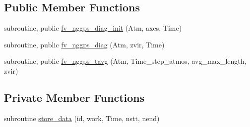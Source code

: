 \subsection*{Public Member Functions}
\begin{DoxyCompactItemize}
\item 
subroutine, public \hyperlink{classfv__nggps__diags__mod_ab37da1eb0394d52c06db856e9f875833}{fv\-\_\-nggps\-\_\-diag\-\_\-init} (Atm, axes, Time)
\item 
subroutine, public \hyperlink{classfv__nggps__diags__mod_a2067cd5af978609a6dc1614795abea87}{fv\-\_\-nggps\-\_\-diag} (Atm, zvir, Time)
\item 
subroutine, public \hyperlink{classfv__nggps__diags__mod_a87ed4a1f80258a1b15835104526747e8}{fv\-\_\-nggps\-\_\-tavg} (Atm, Time\-\_\-step\-\_\-atmos, avg\-\_\-max\-\_\-length, zvir)
\end{DoxyCompactItemize}
\subsection*{Private Member Functions}
\begin{DoxyCompactItemize}
\item 
subroutine \hyperlink{classfv__nggps__diags__mod_a4f6c0fecf1cbb62eb2990ed66895f59a}{store\-\_\-data} (id, work, Time, nstt, nend)
\end{DoxyCompactItemize}
